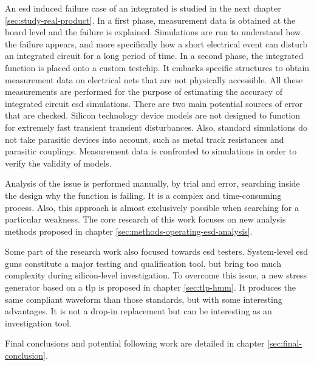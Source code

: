 An \gls{esd} induced failure case of an integrated is studied in the next chapter \ref{sec:study-real-product}.
In a first phase, measurement data is obtained at the board level and the failure is explained.
Simulations are run to understand how the failure appears, and more specifically how a short electrical event can disturb an integrated circuit for a long period of time.
In a second phase, the integrated function is placed onto a custom testchip.
It embarks specific structures to obtain measurement data on electrical nets that are not physically accessible.
All these measurements are performed for the purpose of estimating the accuracy of integrated circuit \gls{esd} simulations.
There are two main potential sources of error that are checked.
Silicon technology device models are not designed to function for extremely fast transient transient disturbances.
Also, standard simulations do not take parasitic devices into account, such as metal track resistances and parasitic couplings.
Measurement data is confronted to simulations in order to verify the validity of models.

%
Analysis of the issue is performed manually, by trial and error, searching inside the design why the function is failing.
It is a complex and time-consuming process.
Also, this approach is almost exclusively possible when searching for a particular weakness.
The core research of this work focuses on new analysis methods proposed in chapter \ref{sec:methods-operating-esd-analysis}.

%
Some part of the research work also focused towards \gls{esd} testers.
System-level \gls{esd} guns \cite{iec61000-4-2, iso10605} constitute a major testing and qualification tool, but bring too much complexity during silicon-level investigation.
To overcome this issue, a new stress generator based on a \gls{tlp} is proposed in chapter \ref{sec:tlp-hmm}.
It produces the same compliant waveform than those standards, but with some interesting advantages.
It is not a drop-in replacement but can be interesting as an investigation tool.

%
Final conclusions and potential following work are detailed in chapter \ref{sec:final-conclusion}.
